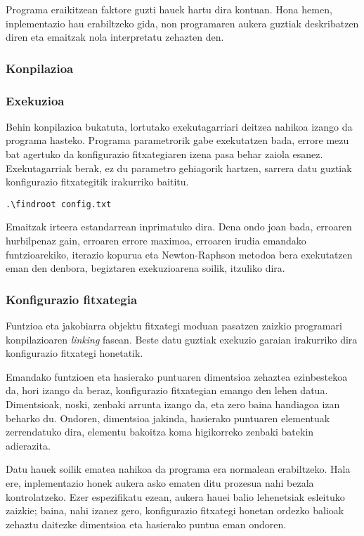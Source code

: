 \documentclass[10pt,a4paper,basque]{article}
\begin{document}
Programa eraikitzean faktore guzti hauek hartu dira kontuan. Hona hemen, inplementazio hau erabiltzeko gida, non programaren aukera guztiak deskribatzen diren eta emaitzak nola interpretatu zehazten den.

\subsubsection{Konpilazioa}

\subsubsection{Exekuzioa}

Behin konpilazioa bukatuta, lortutako exekutagarriari deitzea nahikoa izango da programa hasteko. Programa parametrorik gabe exekutatzen bada, errore mezu bat agertuko da konfigurazio fitxategiaren izena pasa behar zaiola esanez. Exekutagarriak berak, ez du parametro gehiagorik hartzen, sarrera datu guztiak konfigurazio fitxategitik irakurriko baititu.

\begin{lstlisting}
.\findroot config.txt
\end{lstlisting}

Emaitzak irteera estandarrean inprimatuko dira. Dena ondo joan bada, erroaren hurbilpenaz gain, erroaren errore maximoa, erroaren irudia emandako funtzioarekiko, iterazio kopurua eta Newton-Raphson metodoa bera exekutatzen eman den denbora, begiztaren exekuzioarena soilik, itzuliko dira.

\subsubsection{Konfigurazio fitxategia}

Funtzioa eta jakobiarra objektu fitxategi moduan pasatzen zaizkio programari konpilazioaren \emph{linking} fasean. Beste datu guztiak exekuzio garaian irakurriko dira konfigurazio fitxategi honetatik.

Emandako funtzioen eta hasierako puntuaren dimentsioa zehaztea ezinbestekoa da, hori izango da beraz, konfigurazio fitxategian emango den lehen datua. Dimentsioak, noski, zenbaki arrunta izango da, eta zero baina handiagoa izan beharko du. Ondoren, dimentsioa jakinda, hasierako puntuaren elementuak zerrendatuko dira, elementu bakoitza koma higikorreko zenbaki batekin adierazita.

Datu hauek soilik ematea nahikoa da programa era normalean erabiltzeko. Hala ere, inplementazio honek aukera asko ematen ditu prozesua nahi bezala kontrolatzeko. Ezer espezifikatu ezean, aukera hauei balio lehenetsiak esleituko zaizkie; baina, nahi izanez gero, konfigurazio fitxategi honetan ordezko balioak zehaztu daitezke dimentsioa eta hasierako puntua eman ondoren.
\end{document}
